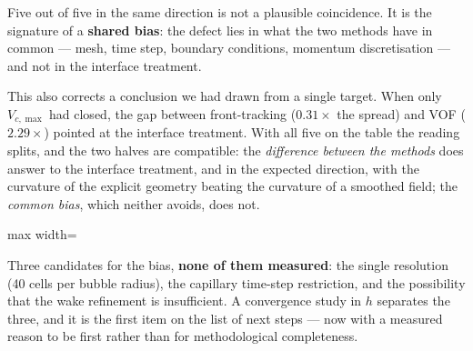 Five out of five in the same direction is not a plausible coincidence. It is
the signature of a \textbf{shared bias}: the defect lies in what the two
methods have in common --- mesh, time step, boundary conditions, momentum
discretisation --- and not in the interface treatment.

This also corrects a conclusion we had drawn from a single target. When only
$V_{c,\max}$ had closed, the gap between front-tracking ($0.31\times$ the
spread) and VOF ($2.29\times$) pointed at the interface treatment. With all
five on the table the reading splits, and the two halves are compatible: the
\emph{difference between the methods} does answer to the interface treatment,
and in the expected direction, with the curvature of the explicit geometry
beating the curvature of a smoothed field; the \emph{common bias}, which
neither avoids, does not.

\begin{adjustbox}{max width=\linewidth}
\end{adjustbox}

Three candidates for the bias, \textbf{none of them measured}: the single
resolution (40 cells per bubble radius), the capillary time-step restriction,
and the possibility that the wake refinement is insufficient. A convergence
study in $h$ separates the three, and it is the first item on the list of next
steps --- now with a measured reason to be first rather than for methodological
completeness.

